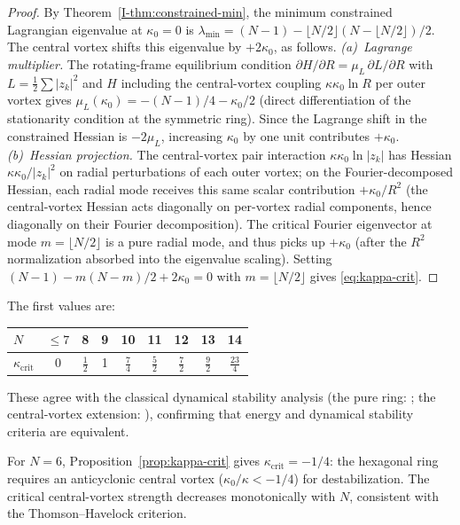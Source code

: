 \begin{proof}
By Theorem~\ref*{I-thm:constrained-min}, the minimum constrained
Lagrangian eigenvalue at $\kappa_0 = 0$ is
$\lambda_{\min} = (N{-}1) - \lfloor N/2\rfloor(N - \lfloor N/2\rfloor)/2$.
The central vortex shifts this eigenvalue by $+2\kappa_0$,
as follows.
\emph{(a)~Lagrange multiplier.}
The rotating-frame equilibrium condition
$\partial H/\partial R = \mu_L\,\partial L/\partial R$
with $L = \tfrac12\sum|z_k|^2$ and $H$ including the
central-vortex coupling $\kappa\kappa_0\ln R$ per outer
vortex gives
$\mu_L(\kappa_0) = -(N{-}1)/4 - \kappa_0/2$
(direct differentiation of the stationarity condition
at the symmetric ring).
Since the Lagrange shift in the constrained Hessian is
$-2\mu_L$, increasing $\kappa_0$ by one unit contributes $+\kappa_0$.
\emph{(b)~Hessian projection.}
The central-vortex pair interaction
$\kappa\kappa_0 \ln|z_k|$ has Hessian
$\kappa\kappa_0/|z_k|^2$ on radial perturbations of each
outer vortex; on the Fourier-decomposed Hessian, each radial
mode receives this same scalar contribution $+\kappa_0/R^2$
(the central-vortex Hessian acts diagonally on per-vortex
radial components, hence diagonally on their Fourier
decomposition).
The critical Fourier eigenvector at mode $m = \lfloor N/2\rfloor$
is a pure radial mode, and thus picks up $+\kappa_0$ (after
the $R^2$ normalization absorbed into the eigenvalue scaling).
Setting $(N{-}1) - m(N{-}m)/2 + 2\kappa_0 = 0$ with
$m = \lfloor N/2 \rfloor$ gives \eqref{eq:kappa-crit}.
\end{proof}

\noindent
The first values are:

\begin{center}
\begin{tabular}{lcccccccc}
\toprule
$N$ & $\le 7$ & 8 & 9 & 10 & 11 & 12 & 13 & 14 \\
\midrule
$\kappa_{\mathrm{crit}}$ & 0 & $\frac12$ & 1 &
  $\frac74$ & $\frac52$ & $\frac72$ & $\frac92$ & $\frac{23}{4}$ \\
\bottomrule
\end{tabular}
\end{center}

\noindent
These agree with the classical dynamical stability analysis
(the pure ring: \citealt{Thomson1883}; the central-vortex extension:
\citealt{Havelock1931}), confirming that energy and dynamical
stability criteria are equivalent.

For $N = 6$, Proposition~\ref{prop:kappa-crit} gives $\kappa_{\mathrm{crit}} = -1/4$: the hexagonal ring requires an anticyclonic central vortex ($\kappa_0/\kappa < -1/4$) for destabilization. The critical central-vortex strength decreases monotonically with $N$, consistent with the Thomson--Havelock criterion.


